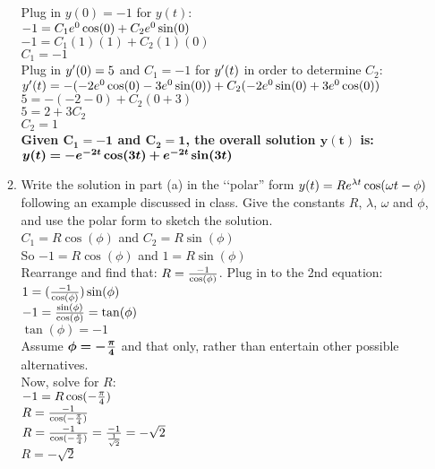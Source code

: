 \documentclass{article}
\begin{document}
\begin{enumerate}
\begin{enumerate}
Plug in $y(0)=-1$ for $y(t)$:\\
$-1 = C_{1}e\sp{0}\cos(0) + C_{2}e\sp{0}\sin(0)$\\
$-1 = C_{1}(1)(1) + C_{2}(1)(0)$\\
$C_{1} = -1$\\

Plug in $y\sp\prime(0)=5$ and $C_{1} = -1$ for $y\sp\prime(t)$ in order to determine $C_2$:\\
$y\sp\prime(t) = -(-2e\sp{0}\cos(0) - 3e\sp{0}\sin(0))+ C_{2}(-2e\sp{0}\sin(0) + 3e\sp{0}\cos(0))$\\
$5 = -(-2 - 0)+ C_{2}(0 + 3)$\\
$5 = 2+ 3C_{2}$\\
$C_2 = 1$\\

\textbf{Given $\bm{C_{1} = -1}$ and $\bm{C_{2} = 1}$, the overall solution $\bm{y(t)}$ is:}\\
$\bm{y(t) = -e\sp{-2t}\cos(3t) + e\sp{-2t}\sin(3t)}$\\


\item Write the solution in part (a) in the \lq\lq polar'' form $y(t)=Re\sp{\lambda t}\cos(\omega t-\phi)$ following an example discussed in class.  Give the constants $R$, $\lambda$, $\omega$ and $\phi$, and use the polar form to sketch the solution.\\

$C_1 = R\cos(\phi)$ and $C_2 = R\sin(\phi)$\\
So $-1 = R\cos(\phi)$ and $1 = R\sin(\phi)$\\
Rearrange and find that: $R ={-1\over \cos(\phi)}$. Plug in to the 2nd equation:\\
$1 = ({-1\over \cos(\phi)})\sin(\phi)$\\
$-1 = {\sin(\phi)\over \cos(\phi)} = \tan(\phi)$\\
$\tan(\phi) = -1$\\
Assume $\bm{\phi = -{\pi \over4}}$ and that only, rather than entertain other possible alternatives.\\
Now, solve for $R$:\\
$-1 = R\cos(-{\pi \over 4})$\\
$R = {-1\over \cos(-{\pi \over 4})}$\\
$R = {-1\over \cos(-{\pi \over 4})} = {-1\over {1 \over \sqrt{2}}} = -\sqrt{2}$\\
$R = -\sqrt{2}$\\


\end{enumerate}
\end{enumerate}
\end{document}
